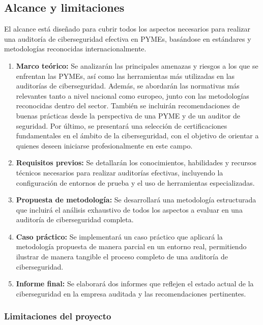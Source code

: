\documentclass[a4paper, 11pt]{article}
\begin{document}
\subsection{Alcance y limitaciones}
\par\vspace{0.5cm}

El alcance está diseñado para cubrir todos los aspectos necesarios para realizar una auditoría de ciberseguridad efectiva en PYMEs, basándose en estándares y metodologías reconocidas internacionalmente.

\begin{enumerate}
    \item \textbf{Marco teórico:} Se analizarán las principales amenazas y riesgos a los que se enfrentan las PYMEs, así como las herramientas más utilizadas en las auditorías de ciberseguridad. Además, se abordarán las normativas más relevantes tanto a nivel nacional como europeo, junto con las metodologías reconocidas dentro del sector. También se incluirán recomendaciones de buenas prácticas desde la perspectiva de una PYME y de un auditor de seguridad. Por último, se presentará una selección de certificaciones fundamentales en el ámbito de la ciberseguridad, con el objetivo de orientar a quienes deseen iniciarse profesionalmente en este campo.    
    
    \item \textbf{Requisitos previos:} Se detallarán los conocimientos, habilidades y recursos técnicos necesarios para realizar auditorías efectivas, incluyendo la configuración de entornos de prueba y el uso de herramientas especializadas.
        
    \item \textbf{Propuesta de metodología:} Se desarrollará una metodología estructurada que incluirá el análisis exhaustivo de todos los aspectos a evaluar en una auditoría de ciberseguridad completa.
    \item \textbf{Caso práctico:} Se implementará un caso práctico que aplicará la metodología propuesta de manera parcial en un entorno real, permitiendo ilustrar de manera tangible el proceso completo de una auditoría de ciberseguridad.
    
    \item \textbf{Informe final:} Se elaborará dos informes que reflejen el estado actual de la ciberseguridad en la empresa auditada y las recomendaciones pertinentes.
\end{enumerate}

\subsubsection*{Limitaciones del proyecto}
\par\vspace{0.3cm}
\end{document}
